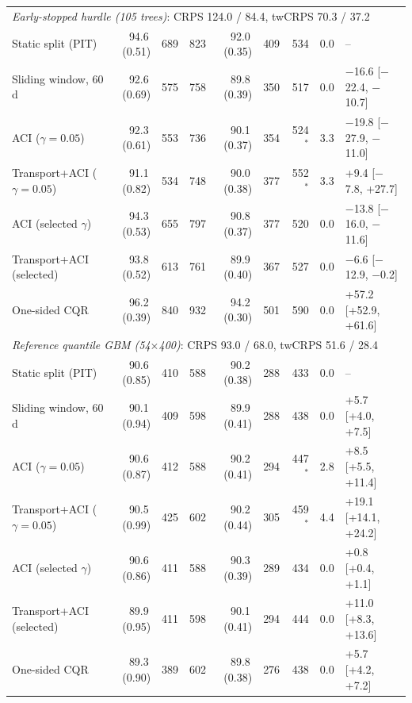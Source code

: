 \begin{table}[tp]
\begin{tabular}{l rrr rrrrl}
\multicolumn{9}{l}{\textit{Early-stopped hurdle (105 trees)}: CRPS 124.0 / 84.4, twCRPS 70.3 / 37.2} \\
\quad Static split (PIT) & 94.6\,(0.51) & 689 & 823 & 92.0\,(0.35) & 409 & 534 & 0.0 & -- \\
\quad Sliding window, 60 d & 92.6\,(0.69) & 575 & 758 & 89.8\,(0.39) & 350 & 517 & 0.0 & $-$16.6 [$-$22.4, $-$10.7] \\
\quad ACI ($\gamma=0.05$) & 92.3\,(0.61) & 553 & 736 & 90.1\,(0.37) & 354 & 524$^\ast$ & 3.3 & $-$19.8 [$-$27.9, $-$11.0] \\
\quad Transport+ACI ($\gamma=0.05$) & 91.1\,(0.82) & 534 & 748 & 90.0\,(0.38) & 377 & 552$^\ast$ & 3.3 & +9.4 [$-$7.8, +27.7] \\
\quad ACI (selected $\gamma$) & 94.3\,(0.53) & 655 & 797 & 90.8\,(0.37) & 377 & 520 & 0.0 & $-$13.8 [$-$16.0, $-$11.6] \\
\quad Transport+ACI (selected) & 93.8\,(0.52) & 613 & 761 & 89.9\,(0.40) & 367 & 527 & 0.0 & $-$6.6 [$-$12.9, $-$0.2] \\
\quad One-sided CQR & 96.2\,(0.39) & 840 & 932 & 94.2\,(0.30) & 501 & 590 & 0.0 & +57.2 [+52.9, +61.6] \\
\multicolumn{9}{l}{\textit{Reference quantile GBM (54$\times$400)}: CRPS 93.0 / 68.0, twCRPS 51.6 / 28.4} \\
\quad Static split (PIT) & 90.6\,(0.85) & 410 & 588 & 90.2\,(0.38) & 288 & 433 & 0.0 & -- \\
\quad Sliding window, 60 d & 90.1\,(0.94) & 409 & 598 & 89.9\,(0.41) & 288 & 438 & 0.0 & +5.7 [+4.0, +7.5] \\
\quad ACI ($\gamma=0.05$) & 90.6\,(0.87) & 412 & 588 & 90.2\,(0.41) & 294 & 447$^\ast$ & 2.8 & +8.5 [+5.5, +11.4] \\
\quad Transport+ACI ($\gamma=0.05$) & 90.5\,(0.99) & 425 & 602 & 90.2\,(0.44) & 305 & 459$^\ast$ & 4.4 & +19.1 [+14.1, +24.2] \\
\quad ACI (selected $\gamma$) & 90.6\,(0.86) & 411 & 588 & 90.3\,(0.39) & 289 & 434 & 0.0 & +0.8 [+0.4, +1.1] \\
\quad Transport+ACI (selected) & 89.9\,(0.95) & 411 & 598 & 90.1\,(0.41) & 294 & 444 & 0.0 & +11.0 [+8.3, +13.6] \\
\quad One-sided CQR & 89.3\,(0.90) & 389 & 602 & 89.8\,(0.38) & 276 & 438 & 0.0 & +5.7 [+4.2, +7.2] \\
\bottomrule
\end{tabular}
\end{table}
